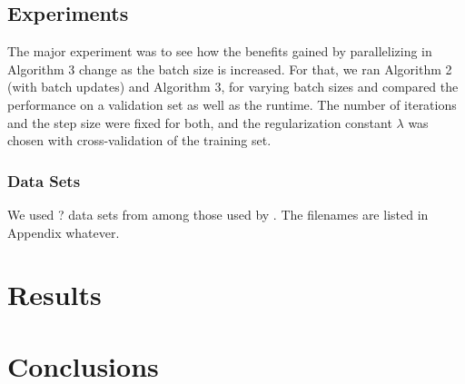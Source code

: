 \documentclass{article}
\begin{document}
\subsection{Experiments}
The major experiment was to see how the benefits gained by parallelizing in Algorithm 3 change as the batch size is increased.  For that, we ran Algorithm 2 (with batch updates) and Algorithm 3, for varying batch sizes and compared the performance on a validation set as well as the runtime. The number of iterations and the step size were fixed for both, and the regularization constant $\lambda$ was chosen with cross-validation of the training set.
\subsubsection{Data Sets}
We used ? data sets from among those used by \cite{shotgun2011}.  The filenames are listed in Appendix whatever.
\section{Results}
\section{Conclusions}



\end{document}
